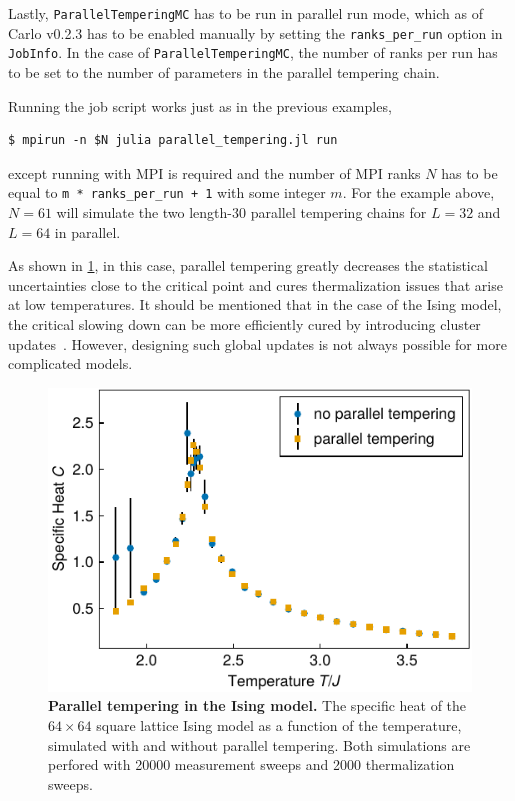 \documentclass{SciPost}
\begin{document}
Lastly, \texttt{ParallelTemperingMC} has to be run in parallel run mode, which as of Carlo v0.2.3 has to be enabled manually by setting the \texttt{ranks\_{}per\_{}run} option in \texttt{JobInfo}. In the case of \texttt{ParallelTemperingMC}, the number of ranks per run has to be set to the number of parameters in the parallel tempering chain.

Running the job script works just as in the previous examples,
\begin{lstlisting}
$ mpirun -n $N julia parallel_tempering.jl run
\end{lstlisting}
except running with MPI is required and the number of MPI ranks $N$ has to be equal to \texttt{m * ranks\_{}per\_{}run + 1} with some integer $m$. For the example above, $N=61$ will simulate the two length-30 parallel tempering chains for $L=32$ and $L=64$ in parallel.

As shown in \cref{fig:parallel_tempering}, in this case, parallel tempering greatly decreases the statistical uncertainties close to the critical point and cures thermalization issues that arise at low temperatures. It should be mentioned that in the case of the Ising model, the critical slowing down can be more efficiently cured by introducing cluster updates~\cite{Wolff1989}. However, designing such global updates is not always possible for more complicated models.

\begin{figure}
\begin{center}
\includegraphics{figs/parallel_tempering.pdf}
\end{center}
\caption{\textbf{Parallel tempering in the Ising model.} The specific heat of the $64 \times 64$ square lattice Ising model as a function of the temperature, simulated with and without parallel tempering. Both simulations are perfored with 20000 measurement sweeps and 2000 thermalization sweeps.}
\label{fig:parallel_tempering}
\end{figure}
\end{document}
